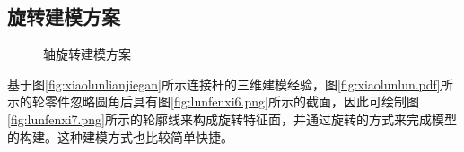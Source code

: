 \subsection{旋转建模方案}

\begin{figure}[htbp]
\centering
{}\hspace{40pt}
\caption{轴旋转建模方案}
\end{figure}

基于图\ref{fig:xiaolunlianjiegan}所示连接杆的三维建模经验，图\ref{fig:xiaolunlun.pdf}所示的轮零件忽略圆角后具有图\ref{fig:lunfenxi6.png}所示的截面，因此可绘制图\ref{fig:lunfenxi7.png}所示的轮廓线来构成旋转特征面，并通过旋转的方式来完成模型的构建。这种建模方式也比较简单快捷。

\endinput